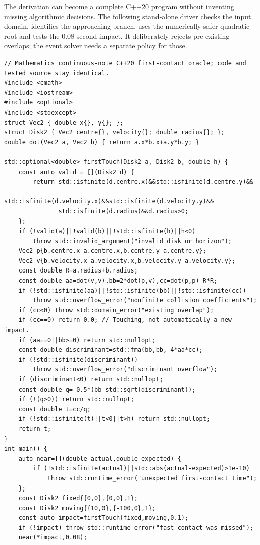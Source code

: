 The derivation can become a complete C++20 program without inventing missing algorithmic decisions. The following stand-alone driver checks the input domain, identifies the approaching branch, uses the numerically safer quadratic root and tests the 0.08-second impact. It deliberately rejects pre-existing overlaps; the event solver needs a separate policy for those.

\begin{verbatim}
// Mathematics continuous-note C++20 first-contact oracle; code and tested source stay identical.
#include <cmath>
#include <iostream>
#include <optional>
#include <stdexcept>
struct Vec2 { double x{}, y{}; };
struct Disk2 { Vec2 centre{}, velocity{}; double radius{}; };
double dot(Vec2 a, Vec2 b) { return a.x*b.x+a.y*b.y; }

std::optional<double> firstTouch(Disk2 a, Disk2 b, double h) {
    const auto valid = [](Disk2 d) {
        return std::isfinite(d.centre.x)&&std::isfinite(d.centre.y)&&
               std::isfinite(d.velocity.x)&&std::isfinite(d.velocity.y)&&
               std::isfinite(d.radius)&&d.radius>0;
    };
    if (!valid(a)||!valid(b)||!std::isfinite(h)||h<0)
        throw std::invalid_argument("invalid disk or horizon");
    Vec2 p{b.centre.x-a.centre.x,b.centre.y-a.centre.y};
    Vec2 v{b.velocity.x-a.velocity.x,b.velocity.y-a.velocity.y};
    const double R=a.radius+b.radius;
    const double aa=dot(v,v),bb=2*dot(p,v),cc=dot(p,p)-R*R;
    if (!std::isfinite(aa)||!std::isfinite(bb)||!std::isfinite(cc))
        throw std::overflow_error("nonfinite collision coefficients");
    if (cc<0) throw std::domain_error("existing overlap");
    if (cc==0) return 0.0; // Touching, not automatically a new impact.
    if (aa==0||bb>=0) return std::nullopt;
    const double discriminant=std::fma(bb,bb,-4*aa*cc);
    if (!std::isfinite(discriminant))
        throw std::overflow_error("discriminant overflow");
    if (discriminant<0) return std::nullopt;
    const double q=-0.5*(bb-std::sqrt(discriminant));
    if (!(q>0)) return std::nullopt;
    const double t=cc/q;
    if (!std::isfinite(t)||t<0||t>h) return std::nullopt;
    return t;
}
int main() {
    auto near=[](double actual,double expected) {
        if (!std::isfinite(actual)||std::abs(actual-expected)>1e-10)
            throw std::runtime_error("unexpected first-contact time");
    };
    const Disk2 fixed{{0,0},{0,0},1};
    const Disk2 moving{{10,0},{-100,0},1};
    const auto impact=firstTouch(fixed,moving,0.1);
    if (!impact) throw std::runtime_error("fast contact was missed");
    near(*impact,0.08);

\end{verbatim}
